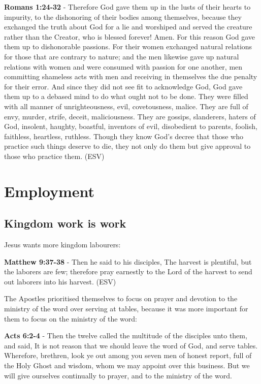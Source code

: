 \documentclass[11pt]{article}
\begin{document}
\textbf{Romans 1:24-32} - Therefore God gave them up in the lusts of their hearts to impurity, to the dishonoring of their bodies among themselves, because they exchanged the truth about God for a lie and worshiped and served the creature rather than the Creator, who is blessed forever! Amen. For this reason God gave them up to dishonorable passions. For their women exchanged natural relations for those that are contrary to nature; and the men likewise gave up natural relations with women and were consumed with passion for one another, men committing shameless acts with men and receiving in themselves the due penalty for their error. And since they did not see fit to acknowledge God, God gave them up to a debased mind to do what ought not to be done. They were filled with all manner of unrighteousness, evil, covetousness, malice. They are full of envy, murder, strife, deceit, maliciousness. They are gossips, slanderers, haters of God, insolent, haughty, boastful, inventors of evil, disobedient to parents, foolish, faithless, heartless, ruthless. Though they know God's decree that those who practice such things deserve to die, they not only do them but give approval to those who practice them. (ESV)

\section{Employment}
\label{sec:org8f7841e}
\subsection{Kingdom work \textbf{is} work}
\label{sec:org083937d}
Jesus wants more kingdom labourers:

\textbf{Matthew 9:37-38} - Then he said to his disciples, The harvest is plentiful, but the laborers are few; therefore pray earnestly to the Lord of the harvest to send out laborers into his harvest. (ESV)

The Apostles prioritised themselves to focus on prayer and devotion to the ministry of the word over serving at tables, because it was more important for them to focus on the ministry of the word:

\textbf{Acts 6:2-4} - Then the twelve called the multitude of the disciples unto them, and said, It is not reason that we should leave the word of God, and serve tables. Wherefore, brethren, look ye out among you seven men of honest report, full of the Holy Ghost and wisdom, whom we may appoint over this business. But we will give ourselves continually to prayer, and to the ministry of the word.
\end{document}
